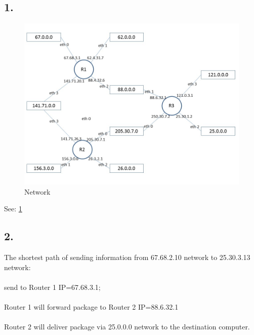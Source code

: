 \documentclass{WeSTassignment}
\begin{document}
\subsection*{1.}
\begin{figure}[ht!]
\centering
\includegraphics[width=\textwidth]{tango_assignment2_2_2.jpg}
\caption{Network \label{overflow}}
\end{figure}

See: \ref{overflow}

\subsection*{2.}
The shortest path of sending information from 67.68.2.10 network to 25.30.3.13 network:\\ \\
send to Router 1 IP=67.68.3.1;\\ \\
Router 1 will forward package to Router 2 IP=88.6.32.1\\ \\
Router 2 will deliver package via 25.0.0.0 network to the destination computer.\\ \\

\end{document}
